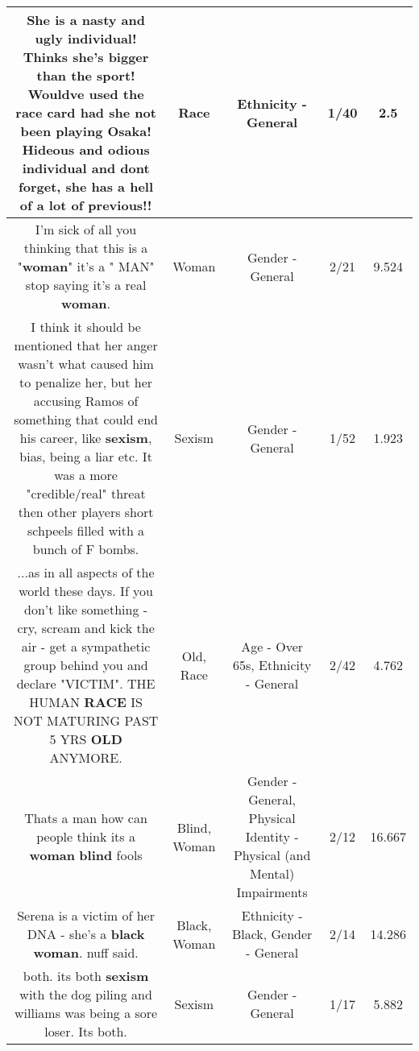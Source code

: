 \documentclass[11pt]{article}
\newlength\mylength
\begin{document}
\begin{center}
\begin{longtable}{|C{.65\mylength}|C{.30\mylength}|C{.12\mylength}|C{.12\mylength}|C{.12\mylength}|}
  \small She is a nasty and ugly individual! Thinks she's bigger than the sport! Wouldve used the \textbf{race} card had she not been playing Osaka! Hideous and odious individual and dont forget, she has a hell of a lot of previous!!\normalsize   & Race & Ethnicity - General & 1/40 & 2.5 \\  \hline
  \small I'm sick of all you thinking that this is a "\textbf{woman}" it's a " MAN" stop saying it's a real \textbf{woman}.\normalsize   & Woman & Gender - General & 2/21 & 9.524 \\  \hline
  \small I think it should be mentioned that her anger wasn't what caused him to penalize her, but her accusing Ramos of something that could end his career, like \textbf{sexism}, bias, being a liar etc. It was a more "credible/real" threat then other players short schpeels filled with a bunch of F bombs.\normalsize   & Sexism & Gender - General & 1/52 & 1.923 \\  \hline
  \small ...as in all aspects of the world these days. If you don't like something - cry, scream and kick the air - get a sympathetic group behind you and declare "VICTIM". THE HUMAN \textbf{RACE} IS NOT MATURING PAST 5 YRS \textbf{OLD} ANYMORE.\normalsize   & Old, Race & Age - Over 65s, Ethnicity - General & 2/42 & 4.762 \\  \hline
  \small Thats a man how can people think its a \textbf{woman} \textbf{blind} fools\normalsize   & Blind, Woman & Gender - General, Physical Identity - Physical (and Mental) Impairments & 2/12 & 16.667 \\  \hline
  \small Serena is a victim of her DNA - she's a \textbf{black} \textbf{woman}. nuff said.\normalsize   & Black, Woman & Ethnicity - Black, Gender - General & 2/14 & 14.286 \\  \hline
  \small both. its both \textbf{sexism} with the dog piling and williams was being a sore loser. Its both.\normalsize   & Sexism & Gender - General & 1/17 & 5.882 \\  \hline

\end{longtable}
\end{center}
\end{document}
